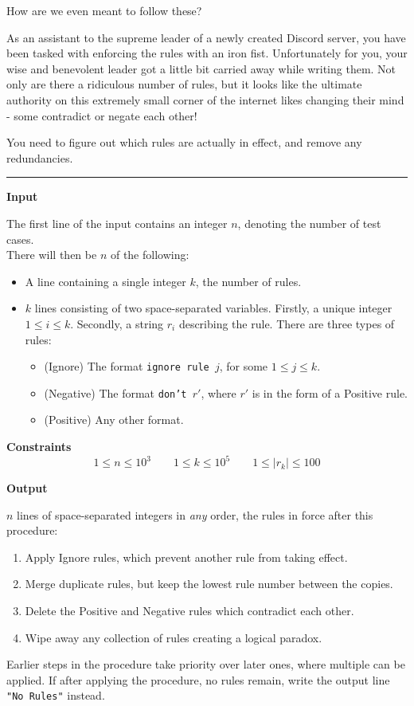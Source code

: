 \togglefalse{IsScore}
{How are we even meant to follow these?}

As an assistant to the supreme leader of a newly created Discord server, you have been tasked with enforcing the rules with an iron fist.
Unfortunately for you, your wise and benevolent leader got a little bit carried away while writing them. 
Not only are there a ridiculous number of rules, but it looks like the ultimate authority on this extremely small corner of the internet likes changing their mind - some contradict or negate each other!

You need to figure out which rules are actually in effect, and remove any redundancies.

\vspace{8pt}
\hrule

\textbf{Input}

The first line of the input contains an integer $n$, denoting the number of test cases. \\
There will then be $n$ of the following:
\begin{itemize}
    \item A line containing a single integer $k$, the number of rules.
    \item $k$ lines consisting of two space-separated variables. 
    Firstly, a unique integer $1 \leq i \leq k$.
    Secondly, a string $r_i$ describing the rule. There are three types of rules:
    \begin{itemize}
        \item (Ignore) The format \texttt{ignore rule }$j$, for some $1 \leq j \leq k$.
        \item (Negative) The format \texttt{don't }$r'$, where $r'$ is in the form of a Positive rule.
        \item (Positive) Any other format.
    \end{itemize}
\end{itemize}

\textbf{Constraints}
\begin{equation*}
    1 \leq n \leq 10^3 \qquad 
    1 \leq k \leq 10^5 \qquad 
    1 \leq |r_k| \leq 100
\end{equation*}

\textbf{Output}

$n$ lines of space-separated integers in \textit{any} order, the rules in force after this procedure:
\begin{enumerate}
    \item Apply Ignore rules, which prevent another rule from taking effect.
    \item Merge duplicate rules, but keep the lowest rule number between the copies.
    \item Delete the Positive and Negative rules which contradict each other.
    \item Wipe away any collection of rules creating a logical paradox.
\end{enumerate}
Earlier steps in the procedure take priority over later ones, where multiple can be applied.
If after applying the procedure, no rules remain, write the output line \texttt{"No Rules"} instead.

